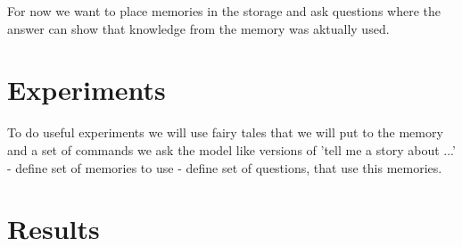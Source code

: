 \documentclass[11pt]{article}
\begin{document}
For now we want to place memories in the storage and ask questions where the answer can show that knowledge from the memory was aktually used.




\section{Experiments}

To do useful experiments we will use fairy tales that we will put to the memory and a set of commands we ask the model
like versions of 'tell me a story about ...' 
- define set of memories to use
- define set of questions, that use this memories.


\section{Results}

\end{document}
